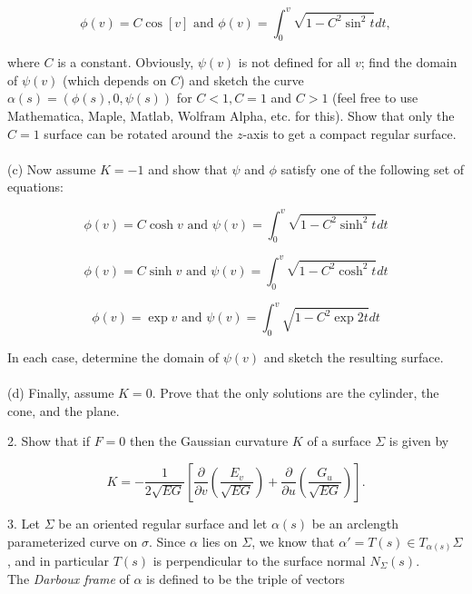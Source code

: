 \documentclass[11pt,letterpaper]{article}
\begin{document}
\[\phi(v)=C\cos[v] \textrm{   and   } \phi(v)=\int_0^v\sqrt{1-C^2\sin^2{t}}dt,
\]

where $C$ is a constant.  Obviously, $\psi(v)$ is not defined for all $v$; find the domain of $\psi(v)$ (which depends on $C$) and sketch the curve $\alpha(s)=(\phi(s),0,\psi(s))$ for $C<1, C=1$ and $C>1$ (feel free to use Mathematica, Maple, Matlab, Wolfram Alpha, etc. for this).  Show that only the $C=1$ surface can be rotated around the $z$-axis to get a compact regular surface.
\\
\\

(c) Now assume $K=-1$ and show that $\psi$ and $\phi$ satisfy one of the following set of equations:

\begin{equation}
\phi(v)=C\cosh{v} \textrm{ and } \psi(v)=\int_0^v\sqrt{1-C^2\sinh^2{t}}dt
\end{equation}

\begin{equation}
\phi(v)=C\sinh{v} \textrm{ and } \psi(v)=\int_0^v\sqrt{1-C^2\cosh^2{t}}dt
\end{equation}

\begin{equation}
\phi(v)=\exp{v} \textrm{ and } \psi(v)=\int_0^v\sqrt{1-C^2\exp{2t}}dt
\end{equation}

In each case, determine the domain of $\psi(v)$ and sketch the resulting surface.
\\
\\

(d) Finally, assume $K=0$.  Prove that the only solutions are the cylinder, the cone, and the plane.
\\
\pagebreak




2. Show that if $F=0$ then the Gaussian curvature $K$ of a surface $\Sigma$ is given by

\[K=-\frac{1}{2\sqrt{EG}}\left[\frac{\partial}{\partial v}\left(\frac{E_v}{\sqrt{EG}}\right)+\frac{\partial}{\partial u}\left(\frac{G_u}{\sqrt{EG}}\right)\right].
\]

\pagebreak




3. Let $\Sigma$ be an oriented regular surface and let $\alpha(s)$ be an arclength parameterized curve on $\sigma$.  Since $\alpha$ lies on $\Sigma$, we know that $\alpha'=T(s)\in T_{\alpha(s)}\Sigma$, and in particular $T(s)$ is perpendicular to the surface normal $N_{\Sigma}(s)$.
\\
The \textit{Darboux frame} of $\alpha$ is defined to be the triple of vectors
\end{document}
